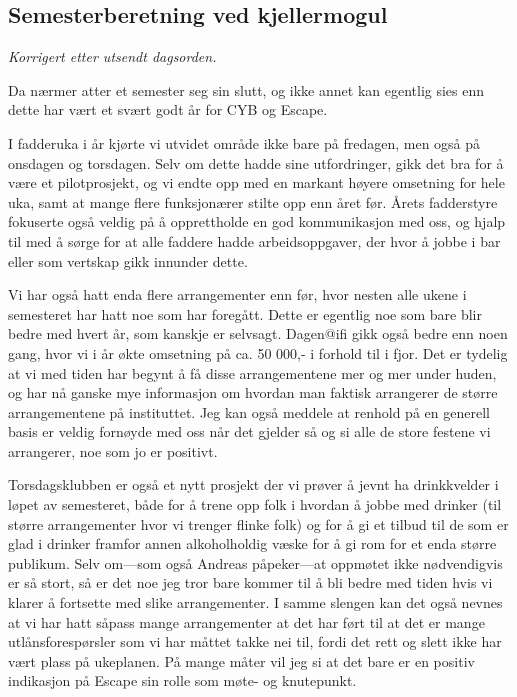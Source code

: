 \documentclass[10pt,norsk,a4paper]{article}
\begin{document}
\newpage


\subsection{Semesterberetning ved kjellermogul}
\textit{\small Korrigert etter utsendt dagsorden.}

\begin{multicols}{2}
	Da nærmer atter et semester seg sin slutt, og ikke annet kan egentlig sies enn dette har vært et svært godt år for CYB og Escape.

	I fadderuka i år kjørte vi utvidet område ikke bare på fredagen, men også på onsdagen og torsdagen. Selv om dette hadde sine utfordringer, gikk det bra for å være et pilotprosjekt, og vi endte opp med en markant høyere omsetning for hele uka, samt at mange flere funksjonærer stilte opp enn året før. Årets fadderstyre fokuserte også veldig på å opprettholde en god kommunikasjon med oss, og hjalp til med å sørge for at alle faddere hadde arbeidsoppgaver, der hvor å jobbe i bar eller som vertskap gikk innunder dette.

	Vi har også hatt enda flere arrangementer enn før, hvor nesten alle ukene i semesteret har hatt noe som har foregått. Dette er egentlig noe som bare blir bedre med hvert år, som kanskje er selvsagt. Dagen@ifi gikk også bedre enn noen gang, hvor vi i år økte omsetning på ca. 50 000,- i forhold til i fjor. Det er tydelig at vi med tiden har begynt å få disse arrangementene mer og mer under huden, og har nå ganske mye informasjon om hvordan man faktisk arrangerer de større arrangementene på instituttet. Jeg kan også meddele at renhold på en generell basis er veldig fornøyde med oss når det gjelder så og si alle de store festene vi arrangerer, noe som jo er positivt.

	Torsdagsklubben er også et nytt prosjekt der vi prøver å jevnt ha drinkkvelder i løpet av semesteret, både for å trene opp folk i hvordan å jobbe med drinker (til større arrangementer hvor vi trenger flinke folk) og for å gi et tilbud til de som er glad i drinker framfor annen alkoholholdig væske for å gi rom for et enda større publikum. Selv om---som også Andreas påpeker---at oppmøtet ikke nødvendigvis er så stort, så er det noe jeg tror bare kommer til å bli bedre med tiden hvis vi klarer å fortsette med slike arrangementer. I samme slengen kan det også nevnes at vi har hatt såpass mange arrangementer at det har ført til at det er mange utlånsforespørsler som vi har måttet takke nei til, fordi det rett og slett ikke har vært plass på ukeplanen. På mange måter vil jeg si at det bare er en positiv indikasjon på Escape sin rolle som møte- og knutepunkt.


\end{multicols}
\end{document}
